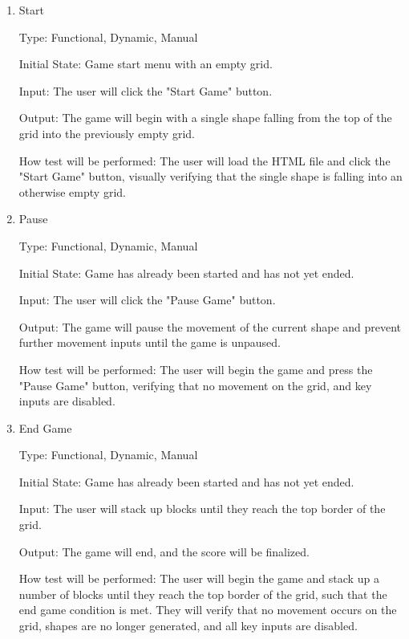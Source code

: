 \documentclass[12pt, titlepage]{article}
\begin{document}
\begin{enumerate}

\item{Start\\}

Type: Functional, Dynamic, Manual
					
Initial State: Game start menu with an empty grid.
					
Input: The user will click the "Start Game" button.
					
Output: The game will begin with a single shape falling from the top of the grid into the previously empty grid.
					
How test will be performed: The user will load the HTML file and click the "Start Game" button, visually verifying that the single shape is falling into an otherwise empty grid.
                    
\item{Pause\\}

Type: Functional, Dynamic, Manual
					
Initial State: Game has already been started and has not yet ended.
					
Input: The user will click the "Pause Game" button.
					
Output: The game will pause the movement of the current shape and prevent further movement inputs until the game is unpaused.
					
How test will be performed: The user will begin the game and press the "Pause Game" button, verifying that no movement on the grid, and key inputs are disabled.
                    
\item{End Game\\}

Type: Functional, Dynamic, Manual
					
Initial State: Game has already been started and has not yet ended.
					
Input: The user will stack up blocks until they reach the top border of the grid.
					
Output: The game will end, and the score will be finalized.
					
How test will be performed: The user will begin the game and stack up a number of blocks until they reach the top border of the grid, such that the end game condition is met. They will verify that no movement occurs on the grid, shapes are no longer generated, and all key inputs are disabled.
					
\end{enumerate}
\end{document}
